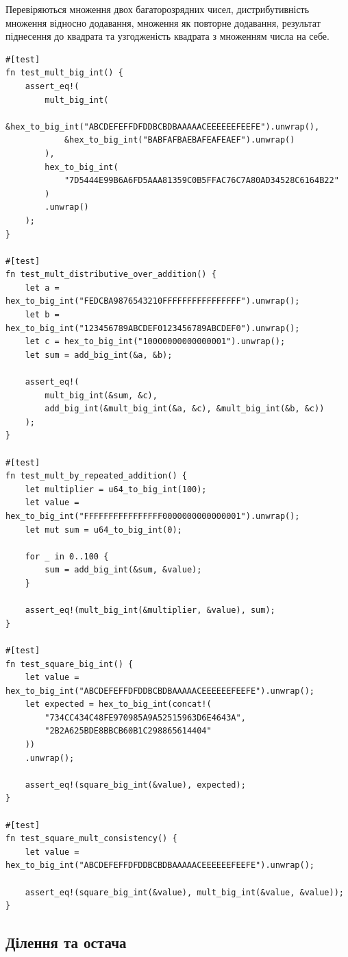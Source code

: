 \documentclass[11pt]{article}
\begin{document}
Перевіряються множення двох багаторозрядних чисел, дистрибутивність множення відносно додавання, множення як повторне додавання, результат піднесення до квадрата та узгодженість квадрата з множенням числа на себе.

\begin{lstlisting}[style=ruststyle]
#[test]
fn test_mult_big_int() {
    assert_eq!(
        mult_big_int(
            &hex_to_big_int("ABCDEFEFFDFDDBCBDBAAAAACEEEEEEFEEFE").unwrap(),
            &hex_to_big_int("BABFAFBAEBAFEAFEAEF").unwrap()
        ),
        hex_to_big_int(
            "7D5444E99B6A6FD5AAA81359C0B5FFAC76C7A80AD34528C6164B22"
        )
        .unwrap()
    );
}

#[test]
fn test_mult_distributive_over_addition() {
    let a = hex_to_big_int("FEDCBA9876543210FFFFFFFFFFFFFFFF").unwrap();
    let b = hex_to_big_int("123456789ABCDEF0123456789ABCDEF0").unwrap();
    let c = hex_to_big_int("10000000000000001").unwrap();
    let sum = add_big_int(&a, &b);

    assert_eq!(
        mult_big_int(&sum, &c),
        add_big_int(&mult_big_int(&a, &c), &mult_big_int(&b, &c))
    );
}

#[test]
fn test_mult_by_repeated_addition() {
    let multiplier = u64_to_big_int(100);
    let value = hex_to_big_int("FFFFFFFFFFFFFFFF0000000000000001").unwrap();
    let mut sum = u64_to_big_int(0);

    for _ in 0..100 {
        sum = add_big_int(&sum, &value);
    }

    assert_eq!(mult_big_int(&multiplier, &value), sum);
}

#[test]
fn test_square_big_int() {
    let value = hex_to_big_int("ABCDEFEFFDFDDBCBDBAAAAACEEEEEEFEEFE").unwrap();
    let expected = hex_to_big_int(concat!(
        "734CC434C48FE970985A9A52515963D6E4643A",
        "2B2A625BDE8BBCB60B1C298865614404"
    ))
    .unwrap();

    assert_eq!(square_big_int(&value), expected);
}

#[test]
fn test_square_mult_consistency() {
    let value = hex_to_big_int("ABCDEFEFFDFDDBCBDBAAAAACEEEEEEFEEFE").unwrap();

    assert_eq!(square_big_int(&value), mult_big_int(&value, &value));
}
\end{lstlisting}

\subsection{Ділення та остача}
\end{document}
